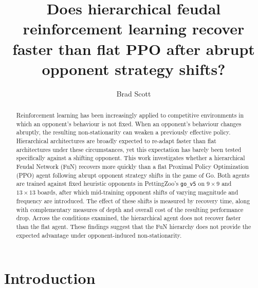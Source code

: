 \documentclass[sigconf,nonacm]{acmart}
\begin{document}
\title{Does hierarchical feudal reinforcement learning recover faster than flat PPO after
       abrupt opponent strategy shifts?}

\author{Brad Scott}

\begin{abstract}
Reinforcement learning has been increasingly applied to competitive environments in which
an opponent's behaviour is not fixed. When an opponent's behaviour changes abruptly, the
resulting non-stationarity can weaken a previously effective policy. Hierarchical architectures are broadly expected to re-adapt faster
than flat architectures under these circumstances, yet this expectation has barely been tested
specifically against a shifting opponent. This work investigates whether a
hierarchical Feudal Network (FuN) recovers more quickly than a flat Proximal
Policy Optimization (PPO) agent following abrupt opponent strategy shifts in the
game of Go. Both
agents are trained against fixed heuristic opponents in PettingZoo's
\texttt{go\_v5} on $9\times9$ and $13\times13$ boards, after which mid-training
opponent shifts of varying magnitude and frequency are introduced. The effect of these shifts is measured by recovery time, along with complementary measures of depth and overall cost of the resulting performance drop. Across the conditions examined, the hierarchical agent does not recover faster than the flat agent.
These findings suggest that the FuN hierarchy does not provide the expected advantage under opponent-induced non-stationarity.
\end{abstract}

\maketitle

\section{Introduction}
\end{document}
